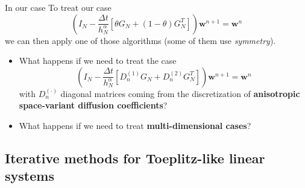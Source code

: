 \documentclass[aspectratio=169,xcolor=dvipsnames]{beamer}
\begin{document}
\begin{frame}{In our case}
To treat our case
\[
\left( I_N - \frac{\Delta t}{h_N^\alpha} \left[ \theta G_N + (1-\theta) G_N^T \right] \right) \mathbf{w}^{n+1} = \mathbf{w}^n
\]
we can then apply one of those algorithms (some of them use \emph{symmetry}).
\begin{itemize}
	\item[\faQuestionCircle]<2-> What happens if we need to treat the case
	\[
	\left( I_N - \frac{\Delta t}{h_N^\alpha} \left[ D_n^{(1)} G_N + D_n^{(2)} G_N^T \right] \right) \mathbf{w}^{n+1} = \mathbf{w}^n
	\]
	with $D_n^{(\cdot)}$ diagonal matrices coming from the discretization of \textbf{anisotropic space-variant diffusion coefficients}?
	\item[\faQuestionCircle]<3-> What happens if we need to treat \textbf{multi-dimensional cases}?
\end{itemize} 
\end{frame}

\subsection{Iterative methods for Toeplitz-like linear systems}
\end{document}
